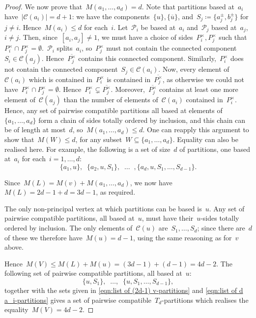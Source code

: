 \documentclass[11pt]{amsart}
\theoremstyle{definition}
\theoremstyle{definition}
\theoremstyle{definition}
\theoremstyle{definition}
\newcommand{\calC}{\mathcal{C}}
\newcommand{\calP}{\mathcal{P}} %
\begin{document}
\begin{proof}
    We now prove that~$M(a_1, \dots, a_d) = d$. Note that partitions based at~$a_i$ have~$\vert \calC(a_i) \vert = d+1$: we have the components~$\{u\}, \{\overline{u}\}$, and~$S_j \coloneqq \{a_j^\pm, b_j^\pm\}$ for~$j \neq i$. Hence~$M(a_i) \leq d$ for each~$i$. Let~$\calP_i$ be based at~$a_i$ and~$\calP_j$ based at~$a_j$,~$i \neq j$. Then, since~$[a_i, a_j] \neq 1$, we must have a choice of sides~$P_i^\times, P_j^\times$ such that~$P_i^\times \cap P_j^\times = \emptyset$.~$\calP_i$ splits~$a_i$, so~$P_j^\times$ must not contain the connected component~$S_i \in \calC(a_j)$. Hence~$\overline{P_j^\times}$ contains this connected component. Similarly,~$P_i^\times$ does not contain the connected component~$S_j \in \calC(a_i)$. Now, every element of~$\calC(a_i)$ which is contained in~$P_i^\times$ is contained in~$\overline{P_j^\times}$, as otherwise we could not have~$P_i^\times \cap P_j^\times = \emptyset$. Hence~$P_i^\times \subsetneq \overline{P_j^\times}$. Moreover,~$\overline{P_j^\times}$ contains at least one more element of~$\calC(a_j)$ than the number of elements of~$\calC(a_i)$ contained in~$P_i^\times$. Hence, any set of pairwise compatible partitions all based at elements of~$\{a_1, \dots, a_d\}$ form a chain of sides totally ordered by inclusion, and this chain can be of length at most~$d$, so~$M(a_1, \dots, a_d) \leq d$. One can reapply this argument to show that~$M(W) \leq d$, for any subset~$W \subseteq \{a_1, \dots, a_d\}$. Equality can also be realised here. For example, the following is a set of size~$d$ of partitions, one based at~$a_i$ for each~$i = 1, \dots, d$:
    \begin{equation}\label{eqn:list of d a_i-partitions}
        \{a_1, u\},\;\; \{a_2, u, S_1\},\;\; \dots\;\;, \{a_d, u, S_1, \dots, S_{d-1}\}.
        \tag{$\star \star$}
    \end{equation}
     
    Since~$M(L) = M(v) + M(a_1, \dots, a_d)$, we now have~$M(L) = 2d-1 + d = 3d-1$, as required.

    The only non-principal vertex at which partitions can be based is~$u$. Any set of pairwise compatible partitions, all based at~$u$, must have their~$u$-sides totally ordered by inclusion. The only elements of~$\calC(u)$ are~$S_1, \dots, S_d$; since there are~$d$ of these we therefore have~$M(u) = d-1$, using the same reasoning as for~$v$ above.

    Hence~$M(V) \leq M(L) + M(u) = (3d-1) + (d-1) = 4d-2$. The following set of pairwise compatible partitions, all based at~$u$:
    \[\{u, S_1\},\;\; \dots,\;\; \{u, S_1, \dots, S_{d-1}\},\]
    together with the sets given in \eqref{eqn:list of (2d-1) v-partitions} and \eqref{eqn:list of d a_i-partitions} gives a set of pairwise compatible~$T_d$-partitions which realises the equality~$M(V) = 4d-2$.
\end{proof}
\end{document}
